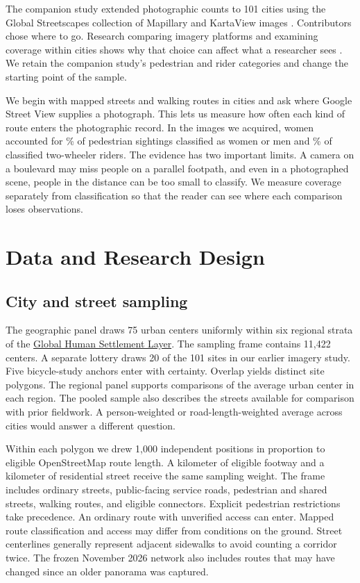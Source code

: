 \documentclass[11pt]{article}
\begin{document}
The companion study extended photographic counts to 101 cities using the Global Streetscapes collection of Mapillary and KartaView images \citep{companion,hou}. Contributors chose where to go. Research comparing imagery platforms and examining coverage within cities shows why that choice can affect what a researcher sees \citep{quinn2019every,coverage}. We retain the companion study's pedestrian and rider categories and change the starting point of the sample.

We begin with mapped streets and walking routes in \Sites{} cities and ask where Google Street View supplies a photograph. This lets us measure how often each kind of route enters the photographic record. In the images we acquired, women accounted for \MWPedPct\% of pedestrian sightings classified as women or men and \MWRiderPct\% of classified two-wheeler riders. The evidence has two important limits. A camera on a boulevard may miss people on a parallel footpath, and even in a photographed scene, people in the distance can be too small to classify. We measure coverage separately from classification so that the reader can see where each comparison loses observations.

\section{Data and Research Design}
\subsection{City and street sampling}
The geographic panel draws 75 urban centers uniformly within six regional strata of the \href{https://doi.org/10.2905/1a338be6-7eaf-480c-9664-3a8ade88cbcd}{Global Human Settlement Layer}. The sampling frame contains 11,422 centers. A separate lottery draws 20 of the 101 sites in our earlier imagery study. Five bicycle-study anchors enter with certainty. Overlap yields \Sites{} distinct site polygons. The regional panel supports comparisons of the average urban center in each region. The pooled sample also describes the streets available for comparison with prior fieldwork. A person-weighted or road-length-weighted average across cities would answer a different question.

Within each polygon we drew 1,000 independent positions in proportion to eligible OpenStreetMap route length. A kilometer of eligible footway and a kilometer of residential street receive the same sampling weight. The frame includes ordinary streets, public-facing service roads, pedestrian and shared streets, walking routes, and eligible connectors. Explicit pedestrian restrictions take precedence. An ordinary route with unverified access can enter. Mapped route classification and access may differ from conditions on the ground. Street centerlines generally represent adjacent sidewalks to avoid counting a corridor twice. The frozen November 2026 network also includes routes that may have changed since an older panorama was captured.
\end{document}
